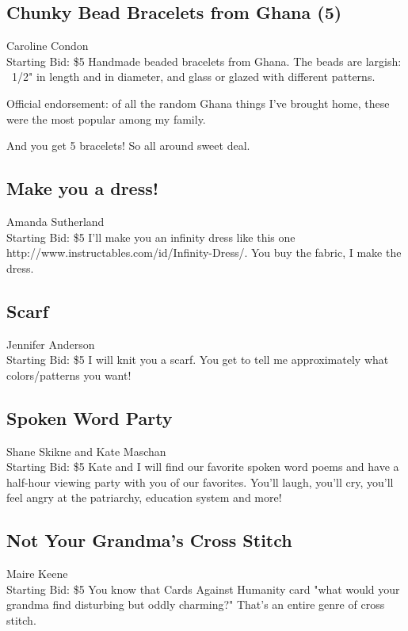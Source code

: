 \documentclass[11pt]{article}
\begin{document}
\subsection{Chunky Bead Bracelets from Ghana (5)}
Caroline Condon
\\
Starting Bid: \$5
\newline
Handmade beaded bracelets from Ghana. The beads are largish: ~1/2" in length and in diameter, and glass or glazed with different patterns.

Official endorsement: of all the random Ghana things I've brought home, these were the most popular among my family.

And you get 5 bracelets! So all around sweet deal.
\subsection{Make you a dress!}
Amanda Sutherland
\\
Starting Bid: \$5
\newline
I'll make you an infinity dress like this one http://www.instructables.com/id/Infinity-Dress/. You buy the fabric, I make the dress.
\subsection{Scarf}
Jennifer Anderson
\\
Starting Bid: \$5
\newline
I will knit you a scarf. You get to tell me approximately what colors/patterns you want!
\subsection{Spoken Word Party}
Shane Skikne and Kate Maschan
\\
Starting Bid: \$5
\newline
Kate and I will find our favorite spoken word poems and have a half-hour viewing party with you of our favorites. You'll laugh, you'll cry, you'll feel angry at the patriarchy, education system and more!
\subsection{Not Your Grandma's Cross Stitch}
Maire Keene
\\
Starting Bid: \$5
\newline
You know that Cards Against Humanity card "what would your grandma find disturbing but oddly charming?" That's an entire genre of cross stitch.
\end{document}
